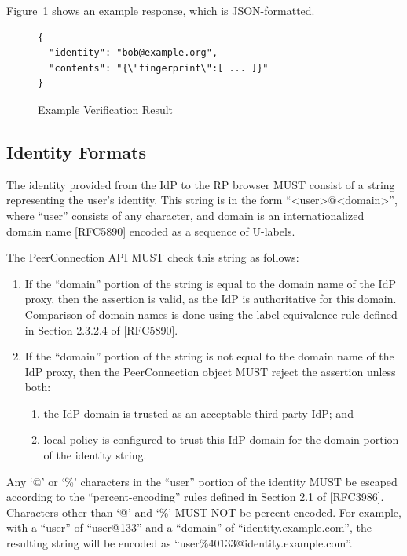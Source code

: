 \documentclass{article}
\begin{document}
Figure~\ref{fig:example-verification} shows an example response, which is JSON-formatted.

\begin{figure}[ht]
\begin{verbatim}
{
  "identity": "bob@example.org",
  "contents": "{\"fingerprint\":[ ... ]}"
}
\end{verbatim}
\caption{Example Verification Result}
\label{fig:example-verification}
\end{figure}

\subsection{Identity Formats}
\label{sec:identity-formats}

The identity provided from the IdP to the RP browser MUST consist of
a string representing the user's identity.  This string is in the
form ``\textless user\textgreater @\textless domain\textgreater'', where ``user'' consists of any character, and
domain is an internationalized domain name [RFC5890] encoded as a
sequence of U-labels.

The PeerConnection API MUST check this string as follows:

\begin{enumerate}
\item If the ``domain'' portion of the string is equal to the domain name
  of the IdP proxy, then the assertion is valid, as the IdP is
  authoritative for this domain.  Comparison of domain names is
  done using the label equivalence rule defined in Section 2.3.2.4
  of [RFC5890].

\item If the ``domain'' portion of the string is not equal to the domain
  name of the IdP proxy, then the PeerConnection object MUST reject
  the assertion unless both:

  \begin{enumerate}
  \item the IdP domain is trusted as an acceptable third-party IdP;
    and

  \item local policy is configured to trust this IdP domain for the
    domain portion of the identity string.
  \end{enumerate}
\end{enumerate}

Any `@' or `\%' characters in the ``user'' portion of the identity MUST
be escaped according to the ``percent-encoding'' rules defined in
Section 2.1 of [RFC3986].  Characters other than `@' and `\%' MUST NOT
be percent-encoded.  For example, with a ``user'' of ``user@133'' and a
``domain'' of ``identity.example.com'', the resulting string will be
encoded as ``user\%40133@identity.example.com''.
\end{document}
